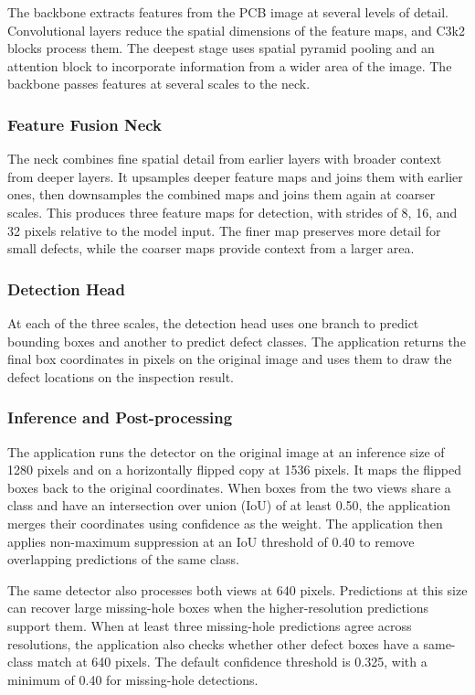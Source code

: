\documentclass[conference]{IEEEtran}
\begin{document}
The backbone extracts features from the PCB image at several levels of detail. Convolutional layers reduce the spatial dimensions of the feature maps, and C3k2 blocks process them. The deepest stage uses spatial pyramid pooling and an attention block to incorporate information from a wider area of the image. The backbone passes features at several scales to the neck.

\subsubsection{Feature Fusion Neck}

The neck combines fine spatial detail from earlier layers with broader context from deeper layers. It upsamples deeper feature maps and joins them with earlier ones, then downsamples the combined maps and joins them again at coarser scales. This produces three feature maps for detection, with strides of 8, 16, and 32 pixels relative to the model input. The finer map preserves more detail for small defects, while the coarser maps provide context from a larger area.

\subsubsection{Detection Head}

At each of the three scales, the detection head uses one branch to predict bounding boxes and another to predict defect classes. The application returns the final box coordinates in pixels on the original image and uses them to draw the defect locations on the inspection result.

\subsubsection{Inference and Post-processing}

The application runs the detector on the original image at an inference size of 1280 pixels and on a horizontally flipped copy at 1536 pixels. It maps the flipped boxes back to the original coordinates. When boxes from the two views share a class and have an intersection over union (IoU) of at least 0.50, the application merges their coordinates using confidence as the weight. The application then applies non-maximum suppression at an IoU threshold of 0.40 to remove overlapping predictions of the same class.

The same detector also processes both views at 640 pixels. Predictions at this size can recover large missing-hole boxes when the higher-resolution predictions support them. When at least three missing-hole predictions agree across resolutions, the application also checks whether other defect boxes have a same-class match at 640 pixels. The default confidence threshold is 0.325, with a minimum of 0.40 for missing-hole detections.
\end{document}

